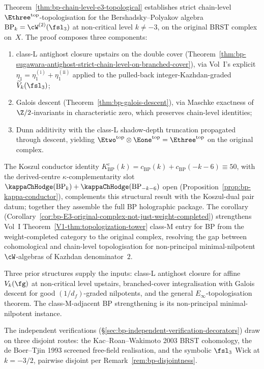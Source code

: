 Theorem~\ref{thm:bp-chain-level-e3-topological} establishes strict
chain-level $\Ethree^{\mathrm{top}}$-topologisation for the
Bershadsky--Polyakov algebra $\mathrm{BP}_k = \cW^{(2)}(\fsl_3)$ at
non-critical level $k \ne -3$, on the original BRST complex on~$X$.
The proof composes three components:
\begin{enumerate}[nosep]
\item class-L antighost closure upstairs on the double cover
 (Theorem~\ref{thm:bp-sugawara-antighost-strict-chain-level-on-branched-cover}),
 via Vol~I's explicit $\eta_1 = \eta_1^{(\mathrm i)} + \eta_1^{(\mathrm{ii})}$
 applied to the pulled-back integer-Kazhdan-graded $\widetilde V_k(\fsl_3)$;
\item Galois descent (Theorem~\ref{thm:bp-galois-descent}), via
 Maschke exactness of $\Z/2$-invariants in characteristic zero,
 which preserves chain-level identities;
\item Dunn additivity with the class-L shadow-depth truncation
 propagated through descent, yielding
 $\Etwo^{\mathrm{top}} \otimes \Eone^{\mathrm{top}} = \Ethree^{\mathrm{top}}$
 on the original complex.
\end{enumerate}

The Koszul conductor identity
$K^{c}_{\mathrm{BP}}(k)
=c_{\mathrm{BP}}(k)+c_{\mathrm{BP}}(-k-6)\equiv 50$, with the
derived-centre $\kappa$-complementarity slot
$\kappaChHodge(\mathrm{BP}_k) + \kappaChHodge(\mathrm{BP}_{-k-6})$
open (Proposition~\ref{prop:bp-kappa-conductor}), complements this
structural result with the Koszul-dual pair datum; together they
assemble the full BP holographic package. The corollary
(Corollary~\ref{cor:bp-E3-original-complex-not-just-weight-completed})
strengthens Vol~I Theorem~\ref{V1-thm:topologization-tower} class-M entry for
BP from the weight-completed category to the original complex,
resolving the gap between cohomological and chain-level
topologisation for non-principal minimal-nilpotent $\cW$-algebras
of Kazhdan denominator~$2$.

Three prior structures supply the inputs: class-L antighost closure
for affine $V_k(\fg)$ at non-critical level upstairs, branched-cover
integralisation with Galois descent for good $(1/d_f)$-graded
nilpotents, and the general $E_\infty$-topologisation theorem. The
class-M-adjacent BP strengthening is its non-principal
minimal-nilpotent instance.

The independent verifications
(\S\ref{sec:bp-independent-verification-decorators}) draw on three
disjoint routes: the Kac--Roan--Wakimoto 2003 BRST cohomology, the
de Boer--Tjin 1993 screened free-field realisation, and the symbolic
$\fsl_3$ Wick at $k = -3/2$, pairwise disjoint per
Remark~\ref{rem:bp-disjointness}.

